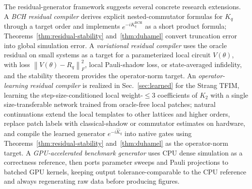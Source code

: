 \documentclass[aps,prresearch,reprint,superscriptaddress,nofootinbib,amsmath,amssymb]{revtex4-2}
\newcommand{\tfim}{TFIM}
\newcommand{\norm}[1]{\left\lVert #1 \right\rVert}
\begin{document}
The residual-generator framework suggests several concrete research extensions. A \emph{BCH residual compiler} derives explicit nested-commutator formulas for $K_q$ through a target order and implements $e^{-iK_q^{\mathrm{BCH}}}$ as a short product formula; Theorems~\ref{thm:residual-stability} and~\ref{thm:duhamel} convert truncation error into global simulation error. A \emph{variational residual compiler} uses the oracle residual on small systems as a target for a parameterized local circuit $V(\theta)$, with loss $\norm{V(\theta)-R_q}_F^2$, local Pauli-shadow loss, or state-averaged infidelity, and the stability theorem provides the operator-norm target. An \emph{operator-learning residual compiler} is realized in Sec.~\ref{sec:learned} for the Strang \tfim{}, learning the step-size-conditioned local weight-$\leq3$ coefficients of $K_2$ with a single size-transferable network trained from oracle-free local patches; natural continuations extend the local templates to other lattices and higher orders, replace patch labels with classical-shadow or commutator estimates on hardware, and compile the learned generator $e^{-i\widehat K_q}$ into native gates using Theorems~\ref{thm:residual-stability} and~\ref{thm:duhamel} as the operator-norm target. A \emph{GPU-accelerated benchmark generator} uses CPU dense simulation as a correctness reference, then ports parameter sweeps and Pauli projections to batched GPU kernels, keeping output tolerance-comparable to the CPU reference and always regenerating raw data before producing figures.
\end{document}
